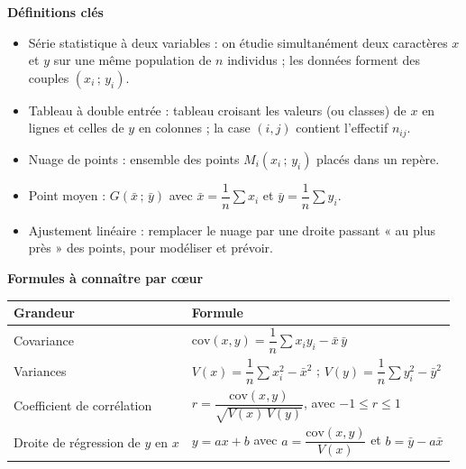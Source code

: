 \documentclass[11pt]{article}
\newcommand{\cle}[1]{{\popxbold\color{popdark}#1}}
\begin{document}
\begin{bilan}
\textbf{Définitions clés}
\begin{itemize}
  \item \cle{Série statistique à deux variables} : on étudie simultanément deux caractères $x$ et $y$ sur une même population de $n$ individus ; les données forment des couples $(x_i\,;\,y_i)$.
  \item \cle{Tableau à double entrée} : tableau croisant les valeurs (ou classes) de $x$ en lignes et celles de $y$ en colonnes ; la case $(i,j)$ contient l'effectif $n_{ij}$.
  \item \cle{Nuage de points} : ensemble des points $M_i(x_i\,;\,y_i)$ placés dans un repère.
  \item \cle{Point moyen} : $G(\bar{x}\,;\,\bar{y})$ avec $\bar{x}=\dfrac{1}{n}\sum x_i$ et $\bar{y}=\dfrac{1}{n}\sum y_i$.
  \item \cle{Ajustement linéaire} : remplacer le nuage par une droite passant « au plus près » des points, pour modéliser et prévoir.
\end{itemize}

\textbf{Formules à connaître par cœur}
\begin{center}
\begin{tabularx}{\linewidth}{|l|X|}
\hline
\rowcolor{popblueL} \textbf{Grandeur} & \textbf{Formule} \\
\hline
Covariance & $\mathrm{cov}(x,y)=\dfrac{1}{n}\sum x_i y_i-\bar{x}\,\bar{y}$ \\
\hline
Variances & $V(x)=\dfrac{1}{n}\sum x_i^2-\bar{x}^2$ ; \quad $V(y)=\dfrac{1}{n}\sum y_i^2-\bar{y}^2$ \\
\hline
Coefficient de corrélation & $r=\dfrac{\mathrm{cov}(x,y)}{\sqrt{V(x)\,V(y)}}$, avec $-1\le r\le 1$ \\
\hline
Droite de régression de $y$ en $x$ & $y=ax+b$ avec $a=\dfrac{\mathrm{cov}(x,y)}{V(x)}$ et $b=\bar{y}-a\bar{x}$ \\
\hline
\end{tabularx}
\end{center}


\end{bilan}
\end{document}
